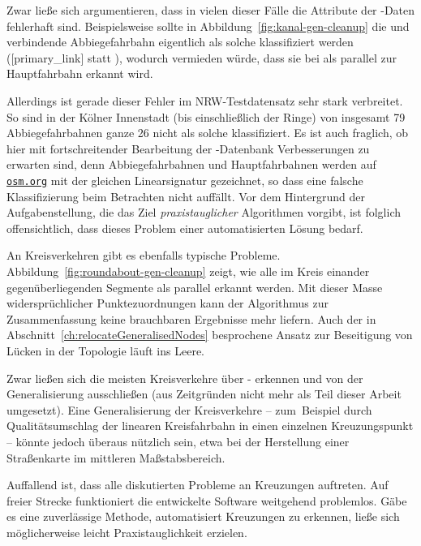 \documentclass[../main/thesis.tex]{subfiles}
\begin{document}
Zwar ließe sich argumentieren, dass in vielen dieser Fälle die Attribute der \osm-Daten fehlerhaft sind.
Beispielsweise sollte in Abbildung~\ref{fig:kanal-gen-cleanup} die  und  verbindende Abbiegefahrbahn eigentlich als solche klassifiziert werden ([primary\_link] statt ), wodurch vermieden würde, dass sie bei  als parallel zur Hauptfahrbahn erkannt wird. 

Allerdings ist gerade dieser Fehler im NRW-Testdatensatz sehr stark verbreitet.
So sind in der Kölner Innenstadt (bis einschließlich der Ringe) von insgesamt 79
Abbiegefahrbahnen ganze 26
nicht als solche klassifiziert.
Es ist auch fraglich, ob hier mit fortschreitender Bearbeitung der \osm-Datenbank Verbesserungen zu erwarten sind, denn Abbiegefahrbahnen und Hauptfahrbahnen werden auf \href{https://www.openstreetmap.org/}{\nolinkurl{osm.org}} mit der gleichen Linearsignatur gezeichnet, so dass eine falsche Klassifizierung beim Betrachten nicht auffällt.
Vor dem Hintergrund der Aufgabenstellung, die das Ziel \emph{praxistauglicher} Algorithmen vorgibt, ist folglich offensichtlich, dass dieses Problem einer automatisierten Lösung bedarf.

An Kreisverkehren gibt es ebenfalls typische Probleme.
Abbildung~\ref{fig:roundabout-gen-cleanup} zeigt, wie alle im Kreis einander gegenüberliegenden Segmente als parallel erkannt werden.
Mit dieser Masse widersprüchlicher Punktezuordnungen kann der Algorithmus zur Zusammenfassung keine brauchbaren Ergebnisse mehr liefern.
Auch der in Abschnitt~\ref{ch:relocateGeneralisedNodes} besprochene Ansatz zur Beseitigung von Lücken in der Topologie läuft ins Leere.

Zwar ließen sich die meisten Kreisverkehre über \osm- erkennen und von der Generalisierung ausschließen (aus Zeitgründen nicht mehr als Teil dieser Arbeit umgesetzt).
Eine Generalisierung der Kreisverkehre -- zum~Beispiel durch Qualitätsumschlag der linearen Kreisfahrbahn in einen einzelnen Kreuzungspunkt -- könnte jedoch überaus nützlich sein, etwa bei der Herstellung einer Straßenkarte im mittleren Maßstabsbereich.

Auffallend ist, dass alle diskutierten Probleme an Kreuzungen auftreten.
Auf freier Strecke funktioniert die entwickelte Software weitgehend problemlos.
Gäbe es eine zuverlässige Methode, automatisiert Kreuzungen zu erkennen, ließe sich möglicherweise leicht Praxistauglichkeit erzielen.
\end{document}
